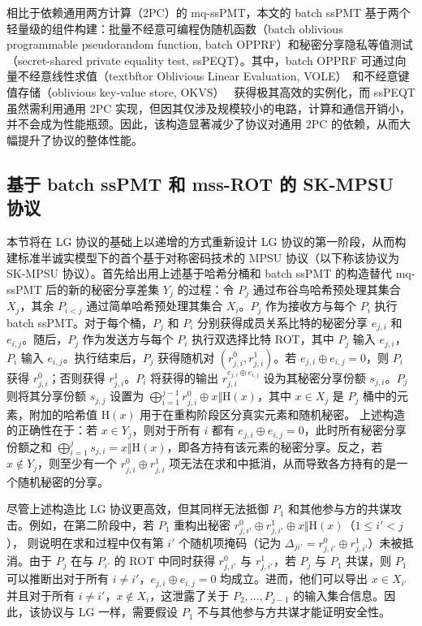 相比于依赖通用两方计算（2PC）的 mq-ssPMT，本文的 batch ssPMT 基于两个轻量级的组件构建：批量不经意可编程伪随机函数（batch oblivious programmable pseudorandom function, batch OPPRF）和秘密分享隐私等值测试（secret-shared private equality test, ssPEQT）。其中，batch OPPRF 可通过向量不经意线性求值（textbftor Oblivious Linear Evaluation, VOLE）~\cite{BCGIKRS19,BCGIKS19,RRT23}和不经意键值存储（oblivious key-value store, OKVS）~\cite{PRTY20,GPRTY-CRYPTO-2021,RR-CCS-2022,BPSY-USENIX-2023} 获得极其高效的实例化，而 ssPEQT 虽然需利用通用 2PC 实现，但因其仅涉及规模较小的电路，计算和通信开销小，并不会成为性能瓶颈。因此，该构造显著减少了协议对通用 2PC 的依赖，从而大幅提升了协议的整体性能。

\subsection{基于 batch ssPMT 和 mss-ROT 的 SK-MPSU 协议} \label{sec:sk-overview}

本节将在 LG 协议的基础上以递增的方式重新设计 LG 协议的第一阶段，从而构建标准半诚实模型下的首个基于对称密码技术的 MPSU 协议（以下称该协议为 SK-MPSU 协议）。首先给出用上述基于哈希分桶和 batch ssPMT 的构造替代 mq-ssPMT 后的新的秘密分享差集 $Y_j$ 的过程：令 $P_j$ 通过布谷鸟哈希预处理其集合 $X_j$，其余 $P_{i<j}$ 通过简单哈希预处理其集合 $X_i$。$P_j$ 作为接收方与每个 $P_i$ 执行 batch ssPMT。对于每个桶，$P_j$ 和 $P_i$ 分别获得成员关系比特的秘密分享 $e_{j,i}$ 和 $e_{i,j}$。随后，$P_j$ 作为发送方与每个 $P_i$ 执行双选择比特 ROT，其中 $P_j$ 输入 $e_{j,i}$，$P_i$ 输入 $e_{i,j}$。执行结束后，$P_j$ 获得随机对 $(r_{j,i}^0, r_{j,i}^1)$。若 $e_{j,i} \oplus e_{i,j} = 0$，则 $P_i$ 获得 $r_{j,i}^0$；否则获得 $r_{j,i}^1$。$P_i$ 将获得的输出 $r_{j,i}^{e_{j,i} \oplus e_{i,j}}$ 设为其秘密分享份额 $s_{j,i}$。$P_j$ 则将其分享份额 $s_{j,j}$ 设置为 $\bigoplus_{i=1}^{j-1} r_{j,i}^0 \oplus x \Vert \text{H}(x)$，其中 $x \in X_j$ 是 $P_j$ 桶中的元素，附加的哈希值 $\text{H}(x)$ 用于在重构阶段区分真实元素和随机秘密。
上述构造的正确性在于：若 $x \in Y_j$，则对于所有 $i$ 都有 $e_{j,i} \oplus e_{i,j} = 0$，此时所有秘密分享份额之和 $\bigoplus_{i=1}^j s_{j,i} = x \Vert \text{H}(x)$，即各方持有该元素的秘密分享。反之，若 $x \notin Y_j$，则至少有一个 $r_{j,i}^0 \oplus r_{j,i}^1$ 项无法在求和中抵消，从而导致各方持有的是一个随机秘密的分享。

尽管上述构造比 LG 协议更高效，但其同样无法抵御 $P_1$ 和其他参与方的共谋攻击。例如，在第二阶段中，若 $P_1$ 重构出秘密 $r_{j,i'}^0 \oplus r_{j,i'}^1 \oplus x \Vert \text{H}(x)$（$1 \le i' < j$），
则说明在求和过程中仅有第 $i'$ 个随机项掩码（记为 $\Delta_{ji'} = r_{j,i'}^0 \oplus r_{j,i'}^1$）未被抵消。由于 $P_j$ 在与 $P_{i'}$ 的 ROT 中同时获得 $r_{j,i'}^0$ 与 $r_{j,i'}^1$，若 $P_j$ 与 $P_1$ 共谋，则 $P_1$ 可以推断出对于所有 $i \ne i'$，$e_{j,i} \oplus e_{i,j} = 0$ 均成立。进而，他们可以导出 $x \in X_{i'}$ 并且对于所有 $i \ne i'$，$x \notin X_i$，这泄露了关于 $P_2, \dots, P_{j-1}$ 的输入集合信息。因此，该协议与 LG 一样，需要假设 $P_1$ 不与其他参与方共谋才能证明安全性。

